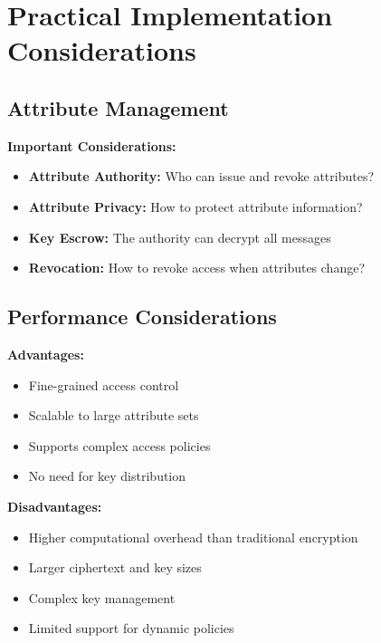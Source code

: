 \documentclass[11pt,a4paper]{article}
\begin{document}
\section{Practical Implementation Considerations}

\subsection{Attribute Management}

\begin{warningbox}
\textbf{Important Considerations:}
\begin{itemize}
    \item \textbf{Attribute Authority:} Who can issue and revoke attributes?
    \item \textbf{Attribute Privacy:} How to protect attribute information?
    \item \textbf{Key Escrow:} The authority can decrypt all messages
    \item \textbf{Revocation:} How to revoke access when attributes change?
\end{itemize}
\end{warningbox}

\subsection{Performance Considerations}

\begin{prosbox}
\textbf{Advantages:}
\begin{itemize}
    \item Fine-grained access control
    \item Scalable to large attribute sets
    \item Supports complex access policies
    \item No need for key distribution
\end{itemize}
\end{prosbox}

\begin{consbox}
\textbf{Disadvantages:}
\begin{itemize}
    \item Higher computational overhead than traditional encryption
    \item Larger ciphertext and key sizes
    \item Complex key management
    \item Limited support for dynamic policies
\end{itemize}
\end{consbox}
\end{document}
